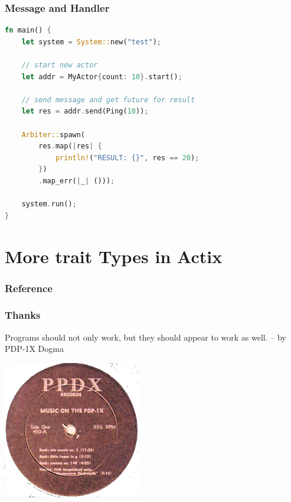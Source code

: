 \documentclass[notheorems, aspectratio=54]{beamer}
\begin{document}
\begin{frame}[fragile]

  \frametitle{Message and Handler}
  \begin{lstlisting}[language=Rust]
fn main() {
    let system = System::new("test");

    // start new actor
    let addr = MyActor{count: 10}.start();

    // send message and get future for result
    let res = addr.send(Ping(10));

    Arbiter::spawn(
        res.map(|res| {
            println!("RESULT: {}", res == 20);
        })
        .map_err(|_| ()));

    system.run();
}
\end{lstlisting}
\end{frame}


\section{More trait Types in Actix}

\begin{frame}[allowframebreaks]
    \frametitle{Reference}
  
  
\end{frame}
\begin{frame}
  \frametitle{Thanks}
  \begin{center}
    Programs should not only work, but they should appear to work as well.
    -- by PDP-1X Dogma
  \end{center}
  \begin{center}
    \includegraphics[height=6cm]{./maxresdefault.png}
  \end{center}
\end{frame}
\end{document}
